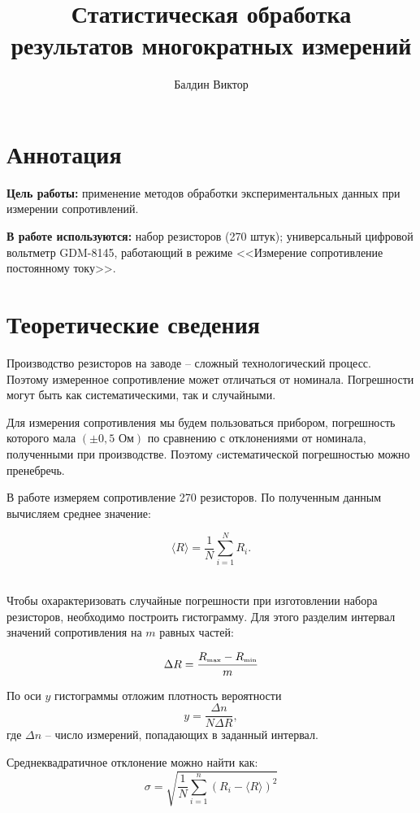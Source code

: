 \documentclass[12pt]{article}
\title{Статистическая обработка результатов многократных измерений}
\author{Балдин Виктор}
\begin{document}
    \maketitle
    \section{Аннотация}
    \par \textbf{Цель работы:} применение методов обработки
    экспериментальных данных при измерении сопротивлений.
    \par \textbf{В работе используются:} набор резисторов (270 штук); 
    универсальный цифровой вольтметр GDM-8145, работающий в режиме 
    <<Измерение сопротивление постоянному току>>.
    \section{Теоретические сведения}
    \par Производство резисторов на заводе -- сложный технологический процесс. 
    Поэтому измеренное сопротивление может отличаться от номинала. Погрешности 
    могут быть как систематическими, так и случайными.
    \par Для измерения сопротивления мы будем пользоваться прибором, погрешность
     которого мала  $\left(  \pm 0,5 \mbox{ Ом} \right) $ по сравнению с 
     отклонениями от номинала, полученными при производстве. Поэтому cистематической 
     погрешностью можно пренебречь.

    \par В работе измеряем сопротивление 270 резисторов. 
    По полученным данным вычисляем среднее значение:

    \begin{equation}\label{for1}
        \langle R \rangle = \frac{1}{N} \sum_{i=1}^N R_i.
    \end{equation}\\

    \par Чтобы охарактеризовать случайные погрешности при изготовлении набора резисторов, 
    необходимо построить гистограмму. Для этого разделим интервал значений сопротивления на 
    $m$ равных частей:
    
    \begin{equation}
        \Delta R = \frac{R_{\mbox{\tiny{max}}} - R_{\mbox{\tiny{min}}}}{m}
    \end{equation}

    \par По оси $y$ гистограммы отложим плотность вероятности
    \begin{equation}
        y = \frac{\Delta n}{N\Delta R},
    \end{equation}
    где $\Delta n$ -- число измерений, попадающих в заданный интервал.
    \par Среднеквадратичное отклонение можно найти как:
    \begin{equation}
        \sigma = \sqrt{\frac{1}{N}\sum_{i = 1}^{n}(R_i - \langle R\rangle)^2}
    \end{equation}
\end{document}
